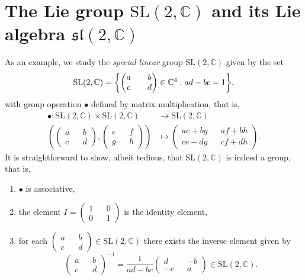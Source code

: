 \section{The Lie group \texorpdfstring{\(\mathrm{SL}(2, \mathbb{C})\)}{(2,C)} and its Lie algebra \texorpdfstring{\(\mathfrak{sl}(2,\mathbb{C})\)}{sl(2,C)}}

As an example, we study the \emph{special linear} group \(\mathrm{SL}(2, \mathbb{C})\) given by the set
\begin{equation*}
    \mathrm{SL}(2, \mathbb{C}) = \set*{\begin{pmatrix}
            a && b\\ c && d
    \end{pmatrix} \in \mathbb{C}^4 : ad - bc = 1},
\end{equation*}
with group operation \(\bullet\) defined by matrix multiplication, that is,
\begin{align*}
    \bullet : \mathrm{SL}(2,\mathbb{C})\times \mathrm{SL}(2, \mathbb{C}) &\to \mathrm{SL}(2, \mathbb{C})\\
    \left(\begin{pmatrix} a && b\\c&&d \end{pmatrix},\begin{pmatrix} e&&f\\g&&h \end{pmatrix} \right) &\mapsto \begin{pmatrix} ae+bg && af + bh\\ ce+dg && cf+dh \end{pmatrix}.
\end{align*}
It is straightforward to show, albeit tedious, that \(\mathrm{SL}(2, \mathbb{C})\) is indeed a group, that is,
\begin{enumerate}[label=(\alph*)]
    \item \(\bullet\) is associative,
    \item the element \(I = \begin{pmatrix} 1 && 0\\ 0 && 1 \end{pmatrix}\) is the identity element,
    \item for each \(\begin{pmatrix} a && b \\ c && d\end{pmatrix} \in \mathrm{SL}(2, \mathbb{C})\) there exists the inverse element given by \[\begin{pmatrix} a && b \\ c && d\end{pmatrix}^{-1} = \frac{1}{ad - bc}\begin{pmatrix}
            d && -b\\-c && a
        \end{pmatrix} \in \mathrm{SL}(2, \mathbb{C}).\]
\end{enumerate}

